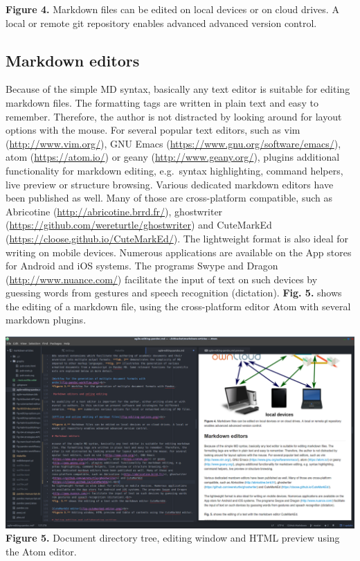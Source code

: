 \documentclass[10pt,fleqn]{wlpeerj}
\begin{document}
\textbf{Figure
4.}
Markdown
files
can
be
edited
on
local
devices
or on
cloud
drives.
A
local
or
remote
git
repository
enables
advanced
advanced
version
control.

\subsection{Markdown
editors}\label{markdown-editors}

Because
of
the
simple
MD
syntax,
basically
any
text
editor
is
suitable
for
editing
markdown
files.
The
formatting
tags
are
written
in
plain
text
and
easy
to
remember.
Therefore,
the
author
is
not
distracted
by
looking
around
for
layout
options
with
the
mouse.
For
several
popular
text
editors,
such
as
vim
(\url{http://www.vim.org/}),
GNU
Emacs
(\url{https://www.gnu.org/software/emacs/}),
atom
(\url{https://atom.io/})
or
geany
(\url{http://www.geany.org/}),
plugins
additional
functionality
for
markdown
editing,
e.g.~syntax
highlighting,
command
helpers,
live
preview
or
structure
browsing.
Various
dedicated
markdown
editors
have
been
published
as
well.
Many
of
those
are
cross-platform
compatible,
such
as
Abricotine
(\url{http://abricotine.brrd.fr/}),
ghostwriter
(\url{https://github.com/wereturtle/ghostwriter})
and
CuteMarkEd
(\url{https://cloose.github.io/CuteMarkEd/}).
The
lightweight
format
is
also
ideal
for
writing
on
mobile
devices.
Numerous
applications
are
available
on
the
App
stores
for
Android
and
iOS
systems.
The
programs
Swype
and
Dragon
(\url{http://www.nuance.com/})
facilitate
the
input
of
text
on
such
devices
by
guessing
words
from
gestures
and
speech
recognition
(dictation).
\textbf{Fig.
5.}
shows
the
editing
of a
markdown
file,
using
the
cross-platform
editor
Atom
with
several
markdown
plugins.

\includegraphics{fig-atom-editor.png}
\textbf{Figure
5.}
Document
directory
tree,
editing
window
and
HTML
preview
using
the
Atom
editor.
\end{document}
